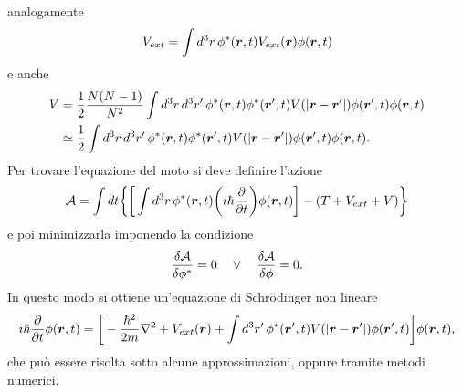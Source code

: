 analogamente
\begin{equation}
    V_{ext} = \int d^3r\,\phi^*(\bm{r},t)V_{ext}(\bm{r})\phi(\bm{r},t)
\end{equation}
e anche
\begin{equation}
    \begin{split}
        V &= \frac{1}{2}\frac{N(N-1)}{N^2}\int d^3r\,d^3r'\,\phi^*(\bm{r},t)\phi^*(\bm{r}',t)V(|\bm{r} - \bm{r}'|)\phi(\bm{r}',t)\phi(\bm{r},t) \\
        &\simeq \frac{1}{2}\int d^3r\,d^3r'\,\phi^*(\bm{r},t)\phi^*(\bm{r}',t)V(|\bm{r} - \bm{r}'|)\phi(\bm{r}',t)\phi(\bm{r},t).
    \end{split}
\end{equation}
Per trovare l'equazione del moto si deve definire l'azione 
\begin{equation}
    \mathcal{A} = \int dt\bigg\{\bigg[\int d^3r\,\phi^*(\bm{r},t)\bigg(i\hbar\frac{\partial}{\partial t}\bigg)\phi(\bm{r},t)\bigg] - (T + V_{ext} + V)\bigg\}
\end{equation}
e poi minimizzarla imponendo la condizione
\begin{equation}
    \frac{\delta\mathcal{A}}{\delta\phi^*} = 0\quad\vee\quad \frac{\delta\mathcal{A}}{\delta\phi} = 0. 
\end{equation}
In questo modo si ottiene un'equazione di Schr\"odinger non lineare
\begin{equation}
\label{eq: equazione di schrodinger non lineare}
    i\hbar\frac{\partial}{\partial t}\phi(\bm{r},t) = \bigg[-\frac{\hbar^2}{2m}\nabla^2 + V_{ext}(\bm{r}) + \int d^3r'\,\phi^*(\bm{r}',t)V(|\bm{r} - \bm{r}'|)\phi(\bm{r}',t)\bigg]\phi(\bm{r},t),
\end{equation}
che può essere risolta sotto alcune approssimazioni, oppure tramite metodi numerici. 

